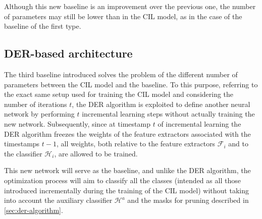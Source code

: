 Although this new baseline is an improvement over the previous one, the number of parameters may still be lower than in the CIL model, as in the case of the baseline of the first type.

\subsection{DER-based architecture}
\label{sec:method-baseline3}
The third baseline introduced solves the problem of the different number of parameters between the CIL model and the baseline.
To this purpose, referring to the exact same setup used for training the CIL model and considering the number of iterations $t$, the DER algorithm is exploited to define another neural network by performing $t$ incremental learning steps without actually training the new network.
Subsequently, since at timestamp $t$ of incremental learning the DER algorithm freezes the weights of the feature extractors associated with the timestamps $t-1$, all weights, both relative to the feature extractors $\mathcal{F}_i$ and to the classifier $\mathcal{H}_{i}$, are allowed to be trained.

This new network will serve as the baseline, and unlike the DER algorithm, the optimization process will aim to classify all the classes (intended as all those introduced incrementally during the training of the CIL model) without taking into account the auxiliary classifier $\mathcal{H}^a$ and the masks for pruning described in \autoref{sec:der-algorithm}.